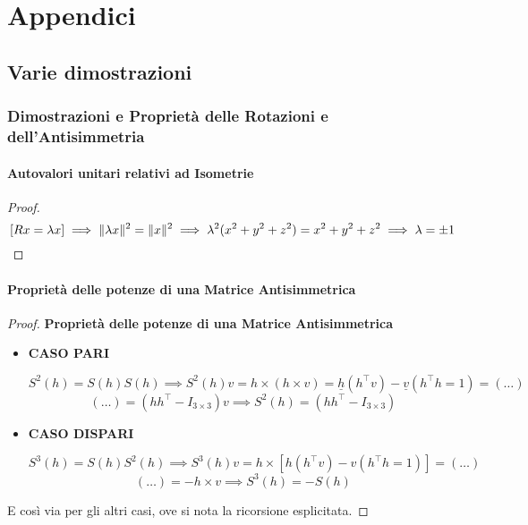 
\chapter{Appendici}
\label{cap:appendix}

\section{Varie dimostrazioni}

\subsection{Dimostrazioni e Proprietà delle Rotazioni e dell'Antisimmetria}

\subsubsection{Autovalori unitari relativi ad Isometrie}

\begin{proof}

\[
	[Rx = \lambda x] \implies \lVert\lambda x\rVert^2=\lVert x\rVert^2 \implies \lambda^2(x^2+y^2+z^2)=x^2+y^2+z^2 \implies \lambda=\pm 1
\]

\end{proof}

\subsubsection{Proprietà delle potenze di una Matrice Antisimmetrica}

\begin{proof}{\textbf{Proprietà delle potenze di una Matrice Antisimmetrica}}

\begin{itemize}

\item{\textbf{CASO PARI}}

\[
	S^2(h) = S(h)S(h) \implies S^2(h)v = h\times(h\times v) = \underline{h}(h^\top v) - \underline{v}(h^\top h = 1) = (\dots)
\]
\[
	(\dots) = (hh^\top -I_{3\times 3})v \implies S^2(h) = (hh^\top - I_{3\times 3})
\]

\item{\textbf{CASO DISPARI}}

\[
	S^3(h) = S(h)S^2(h) \implies S^3(h)v = h\times[h(h^\top v) - v(h^\top h = 1)] = (\dots)
\]
\[
	(\dots) = -h\times v \implies S^3(h) = -S(h)
\]

\end{itemize}

E così via per gli altri casi, ove si nota la ricorsione esplicitata.

\end{proof}

